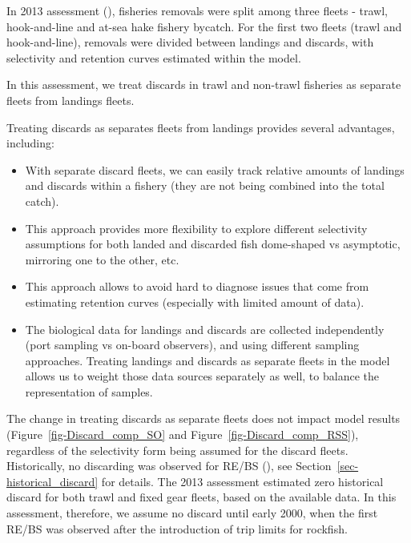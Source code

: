\documentclass[
]{scrartcl}
\providecommand{\tightlist}{%
  \setlength{\itemsep}{0pt}\setlength{\parskip}{0pt}}\usepackage{longtable,booktabs,array}
\begin{document}
In 2013 assessment (), fisheries removals were split among three fleets - trawl,
hook-and-line and at-sea hake fishery bycatch. For the first two fleets
(trawl and hook-and-line), removals were divided between landings and
discards, with selectivity and retention curves estimated within the
model.

In this assessment, we treat discards in trawl and non-trawl fisheries
as separate fleets from landings fleets.

Treating discards as separates fleets from landings provides several
advantages, including:

\begin{itemize}
\tightlist
\item
  With separate discard fleets, we can easily track relative amounts of
  landings and discards within a fishery (they are not being combined
  into the total catch).
\item
  This approach provides more flexibility to explore different
  selectivity assumptions for both landed and discarded fish dome-shaped
  vs asymptotic, mirroring one to the other, etc.
\item
  This approach allows to avoid hard to diagnose issues that come from
  estimating retention curves (especially with limited amount of data).
\item
  The biological data for landings and discards are collected
  independently (port sampling vs on-board observers), and using
  different sampling approaches. Treating landings and discards as
  separate fleets in the model allows us to weight those data sources
  separately as well, to balance the representation of samples.
\end{itemize}

The change in treating discards as separate fleets does not impact model
results (Figure~\ref{fig-Discard_comp_SO} and
Figure~\ref{fig-Discard_comp_RSS}), regardless of the selectivity form
being assumed for the discard fleets. Historically, no discarding was
observed for RE/BS (), see Section~\ref{sec-historical_discard}
for details. The 2013 assessment estimated zero historical discard for
both trawl and fixed gear fleets, based on the available data. In this
assessment, therefore, we assume no discard until early 2000, when the
first RE/BS was observed after the introduction of trip limits for
rockfish.
\end{document}
